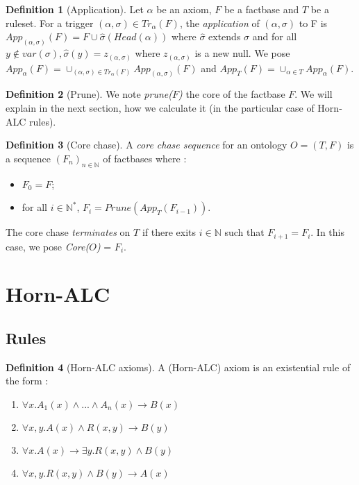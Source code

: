 \documentclass{article}
\theoremstyle{definition}
\newtheorem{definition}{Definition}[section]
\theoremstyle{remark}
\def \N {\mathbb N}
\begin{document}
\begin{definition}[Application]
Let $\alpha$ be an axiom, $F$ be a factbase and $T$ be a ruleset. For a trigger $(\alpha,\sigma) \in Tr_\alpha(F)$, the \emph{application} of $(\alpha,\sigma)$ to F is $App_{(\alpha,\sigma)}(F) = F\cup \hat \sigma(Head(\alpha))$ where $\hat \sigma$ extends $\sigma$ and for all $y \notin var(\sigma), \hat \sigma(y) = z_{(\alpha,\sigma)}$ where $z_{(\alpha,\sigma)}$ is a new null. We pose $App_{\alpha}(F) = \cup_{(\alpha,\sigma) \in Tr_\alpha(F)}App_{(\alpha,\sigma)}(F)$ and $App_{T}(F) = \cup_{\alpha \in T}App_{\alpha}(F)$.

\end{definition} 

\begin{definition}[Prune]
We note \emph{prune($F$)} the core of the factbase $F$. We will explain in the next section, how we calculate it (in the particular case of Horn-ALC rules).

\end{definition} 

\begin{definition}[Core chase]
A \emph{core chase sequence} for an ontology $O = (T,F)$ is a sequence $(F_n)_{n \in \N}$ of factbases where : 
\begin{itemize}
\item $F_0 = F$;
\item for all $i \in \N^*$, $F_i = Prune(App_T(F_{i-1}))$.
\end{itemize}
The core chase \emph{terminates} on $T$ if there exits $i \in \N$ such that $F_{i+1} = F_i$. In this case, we pose \emph{Core($O$)} = $F_i$.
\end{definition} 

\section{Horn-ALC}

\subsection{Rules}

\begin{definition}[Horn-ALC axioms]
A (Horn-ALC) axiom is an existential rule of the form :
\begin{enumerate}
\item $\forall x.A_1(x) \wedge...\wedge A_n(x) \rightarrow B(x)$
\item $\forall x,y.A(x) \wedge R(x,y) \rightarrow B(y)$
\item $\forall x.A(x) \rightarrow \exists y.R(x,y) \wedge B(y)$
\item $\forall x,y.R(x,y) \wedge B(y) \rightarrow A(x) $
\end{enumerate}
\end{definition}
\end{document}

